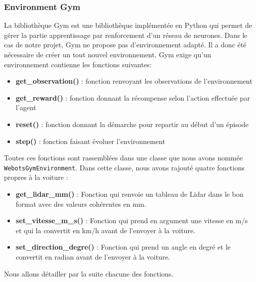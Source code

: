 \documentclass[french]{article}
\begin{document}
\subsubsection*{Environment Gym}
La bibliothèque Gym est une bibliothèque implémentée en Python qui permet de gérer la partie apprentissage par 
renforcement d'un réseau de neurones. Dans le cas de notre projet, Gym ne propose pas d'environnement adapté. 
Il a donc été nécessaire de créer un tout nouvel environnement. Gym exige qu'un environnement contienne les fonctions 
suivantes:
\begin{itemize}
    \item \textbf{get\_observation()} : fonction renvoyant les observations de l'environnement
    \item \textbf{get\_reward()} : fonction donnant la récompense selon l'action effectuée par l'agent
    \item \textbf{reset()} : fonction donnant la démarche pour repartir au début d'un épisode
    \item \textbf{step()} : fonction faisant évoluer l'environnement
\end{itemize}

\vspace{0.5cm}
Toutes ces fonctions sont rassemblées dans une classe que nous avons nommée \texttt{WebotsGymEnvironment}. Dans cette classe, nous avons rajouté quatre fonctions propres à la voiture :
\begin{itemize}
\item \textbf{get\_lidar\_mm()} : Fonction qui renvoie un tableau de Lidar dans le bon format avec des valeurs cohérentes en mm.
\item \textbf{set\_vitesse\_m\_s()} : Fonction qui prend en argument une vitesse en m/s et qui la convertit en km/h avant de l'envoyer à la voiture.
\item \textbf{set\_direction\_degre()} : Fonction qui prend un angle en degré et le convertit en radian avant de l'envoyer à la voiture.
\end{itemize}
\noindent
Nous allons détailler par la suite chacune des fonctions.
\end{document}
